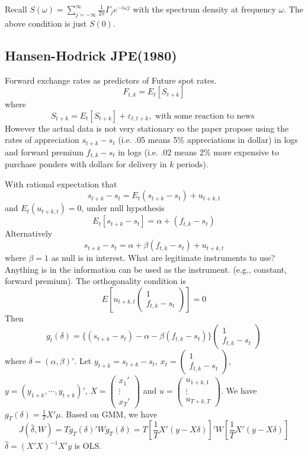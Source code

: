 \documentclass[11pt, a4paper, oneside]{article}
\theoremstyle{definition}
\theoremstyle{proposition}
\theoremstyle{corollary}
\theoremstyle{lemma}
\theoremstyle{theorem}
\begin{document}
Recall $S(\omega) = \sum_{j=-\infty}^{\infty} \frac{1}{2\pi}\Gamma_j e^{-i\omega j}$ with the spectrum density at frequency $\omega$. The above condition is just $S(0)$. 

\subsection{Hansen-Hodrick JPE(1980)}
Forward exchange rates as predictors of Future spot rates. $$F_{t, k} = E_t[S_{t+k}]$$
where $$S_{t+k} = E_t[S_{t+k}] + \varepsilon_{t, t+k}, \text{ with some reaction to news }$$
However the actual data is not very stationary so the paper propose using the rates of appreciation $s_{t+k} -s_t$ (i.e. .05 means 5\% appreciations in dollar) in logs and forward premium $f_{t, k} - s_t$ in logs (i.e. .02 means 2\% more expensive to purchase ponders with dollars for delivery in $k$ periods). 

With rational expectation that $$s_{t+k}-s_t = E_t(s_{t+k} - s_t) + u_{t+k, t}$$ and $E_t(u_{t+k, t}) = 0$,
under null hypothesis $$E_t[s_{t+k} - s_t] = \alpha +(f_{t, k} - s_t)$$
Alternatively
$$s_{t+k} - s_t = \alpha + \beta(f_{t,k} - s_t) + u_{t+k, t}$$ where $\beta = 1$ as null is in interest. What are legitimate instruments to use? Anything is in the information can be used as the instrument. (e.g., constant, forward premium). The orthogonality condition is
$$E\left[u_{t+k, t}\begin{pmatrix} 1 \\ f_{t, k} - s_t\end{pmatrix}\right]  = 0$$
Then $$g_t(\delta) = \{(s_{t+k} - s_t) - \alpha - \beta(f_{t, k} - s_t)\}\begin{pmatrix} 1 \\ f_{t, k} - s_t\end{pmatrix}$$
where $\delta = (\alpha, \beta)'$. Let $y_{t+k} = s_{t+k} - s_t$, $x_t = \begin{pmatrix} 1 \\ f_{t, k} - s_t\end{pmatrix}$, $y = (y_{1+k}, \cdots, y_{t+k})'$, $X=\begin{pmatrix} x_1' \\ \vdots \\ x_T'\end{pmatrix}$ and $u = \begin{pmatrix} u_{1+k, 1} \\ \vdots \\ u_{T+k, T}\end{pmatrix}$. We have $g_T(\delta) = \frac{1}{T}X'\mu$. Based on GMM, we have $$J(\hat{\delta}, W) = Tg_T(\delta)'Wg_T(\delta)=T\left[\frac{1}{T}X'(y - X\delta)\right]'W\left[\frac{1}{T}X'(y - X\delta)\right]$$ 
$\hat{\delta} = (X'X)^{-1}X'y$ is OLS. 
\end{document}
